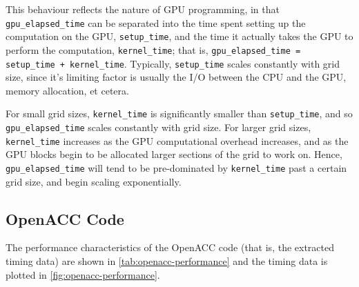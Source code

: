 \documentclass{article}
\begin{document}
This behaviour reflects the nature of GPU programming, in that
\lstinline{gpu_elapsed_time} can be separated into the time spent setting up the
computation on the GPU, \lstinline{setup_time}, and the time it actually takes
the GPU to perform the computation, \lstinline{kernel_time}; that is,
\lstinline{gpu_elapsed_time = setup_time + kernel_time}.
Typically, \lstinline{setup_time} scales constantly with grid size, since it's
limiting factor is usually the I/O between the CPU and the GPU, memory
allocation, et cetera.

For small grid sizes, \lstinline{kernel_time} is significantly smaller than
\lstinline{setup_time}, and so \lstinline{gpu_elapsed_time} scales constantly
with grid size.
For larger grid sizes, \lstinline{kernel_time} increases as the GPU
computational overhead increases, and as the GPU blocks begin to be allocated
larger sections of the grid to work on.
Hence, \lstinline{gpu_elapsed_time} will tend to be pre-dominated by
\lstinline{kernel_time} past a certain grid size, and begin scaling
exponentially.

\clearpage
\subsection{OpenACC Code}
\label{sec:cpu-code}

The performance characteristics of the OpenACC code (that is, the extracted
timing data) are shown in \autoref{tab:openacc-performance} and the timing data is
plotted in \autoref{fig:openacc-performance}.

\begin{table}[h]
  \begin{center}
  \end{center}
  \caption{
    Performance characteristics of OpenACC code, compiled with
    \lstinline[language=bash]{-02}, and with debugging statements turned off.
    All times are presented in units of \si{\ms}.
  }
  \label{tab:openacc-performance}
\end{table}
\end{document}
